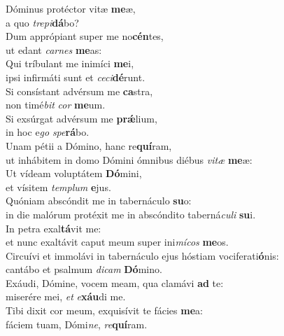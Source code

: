 \evenverse Dóminus protéctor vitæ \textbf{me}æ,~\*\\
\evenverse a quo \textit{tre}\textit{pi}\textbf{dá}bo?\\
\oddverse Dum apprópiant super me no\textbf{cén}tes,~\*\\
\oddverse ut edant \textit{car}\textit{nes} \textbf{me}as:\\
\evenverse Qui tríbulant me inimíci \textbf{me}i,~\*\\
\evenverse ipsi infirmáti sunt et \textit{ce}\textit{ci}\textbf{dé}runt.\\
\oddverse Si consístant advérsum me \textbf{ca}stra,~\*\\
\oddverse non timé\textit{bit} \textit{cor} \textbf{me}um.\\
\evenverse Si exsúrgat advérsum me \textbf{prǽ}lium,~\*\\
\evenverse in hoc e\textit{go} \textit{spe}\textbf{rá}bo.\\
\oddverse Unam pétii a Dómino, hanc re\textbf{quí}ram,~\*\\
\oddverse ut inhábitem in domo Dómini ómnibus diébus \textit{vi}\textit{tæ} \textbf{me}æ:\\
\evenverse Ut vídeam voluptátem \textbf{Dó}mini,~\*\\
\evenverse et vísitem \textit{tem}\textit{plum} \textbf{e}jus.\\
\oddverse Quóniam abscóndit me in tabernáculo \textbf{su}o:~\*\\
\oddverse in die malórum protéxit me in abscóndito taberná\textit{cu}\textit{li} \textbf{su}i.\\
\evenverse In petra exal\textbf{tá}vit me:~\*\\
\evenverse et nunc exaltávit caput meum super ini\textit{mí}\textit{cos} \textbf{me}os.\\
\oddverse Circuívi et immolávi in tabernáculo ejus hóstiam vociferati\textbf{ó}nis:~\*\\
\oddverse cantábo et psalmum \textit{di}\textit{cam} \textbf{Dó}mino.\\
\evenverse Exáudi, Dómine, vocem meam, qua clamávi \textbf{ad} te:~\*\\
\evenverse miserére mei, \textit{et} \textit{e}\textbf{xáu}di me.\\
\oddverse Tibi dixit cor meum, exquisívit te fácies \textbf{me}a:~\*\\
\oddverse fáciem tuam, Dómi\textit{ne}, \textit{re}\textbf{quí}ram.\\
